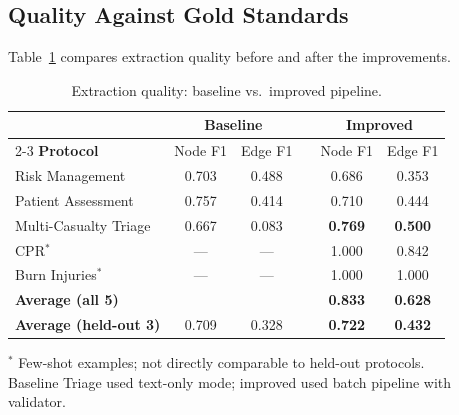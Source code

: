 \documentclass[12pt,a4paper]{article}
\begin{document}
\subsection{Quality Against Gold Standards}

Table~\ref{tab:results} compares extraction quality before and after the improvements.

\begin{table}[H]
\centering
\caption{Extraction quality: baseline vs.\ improved pipeline.}
\label{tab:results}
\begin{tabular}{l *{2}{c} c *{2}{c}}
\toprule
 & \multicolumn{2}{c}{\textbf{Baseline}} && \multicolumn{2}{c}{\textbf{Improved}} \\
\cmidrule{2-3} \cmidrule{5-6}
\textbf{Protocol} & Node F1 & Edge F1 && Node F1 & Edge F1 \\
\midrule
Risk Management        & 0.703 & 0.488 && 0.686 & 0.353 \\
Patient Assessment     & 0.757 & 0.414 && 0.710 & 0.444 \\
Multi-Casualty Triage  & 0.667 & 0.083 && \textbf{0.769} & \textbf{0.500} \\
CPR$^*$                & ---   & ---   && 1.000 & 0.842 \\
Burn Injuries$^*$      & ---   & ---   && 1.000 & 1.000 \\
\midrule
\textbf{Average (all 5)}       &       &       && \textbf{0.833} & \textbf{0.628} \\
\textbf{Average (held-out 3)}  & 0.709 & 0.328 && \textbf{0.722} & \textbf{0.432} \\
\bottomrule
\end{tabular}

\smallskip
\footnotesize $^*$ Few-shot examples; not directly comparable to held-out protocols.\\
\footnotesize Baseline Triage used text-only mode; improved used batch pipeline with validator.
\end{table}
\end{document}
